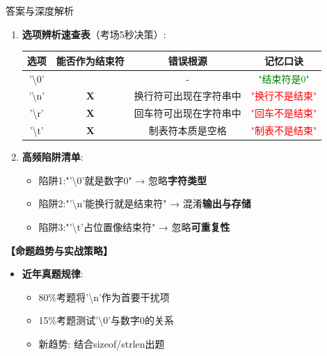 \documentclass[a4paper,12pt]{article}
\begin{document}
\begin{bluebox}{答案与深度解析}
\begin{enumerate}[leftmargin=*, nosep]
		\item \textbf{选项辨析速查表}（考场5秒决策）:
		      \begin{tabular}{|c|c|c|c|}
			      \hline
			      \textbf{选项}        & \textbf{能否作为结束符} & \textbf{错误根源} & \textbf{记忆口诀}              \\
			      \hline
			      '\textbackslash0'  & \checkmark       & -             & \textcolor{green}{"结束符是0"} \\
			      \hline
			      '\textbackslash n' & \textbf{X}       & 换行符可出现在字符串中   & \textcolor{red}{"换行不是结束"}  \\
			      \hline
			      '\textbackslash r' & \textbf{X}       & 回车符可出现在字符串中   & \textcolor{red}{"回车不是结束"}  \\
			      \hline
			      '\textbackslash t' & \textbf{X}       & 制表符本质是空格      & \textcolor{red}{"制表不是结束"}  \\
			      \hline
		      \end{tabular}

		\item \textbf{高频陷阱清单}:
		      \begin{itemize}
			      \item 陷阱1:"'\textbackslash0'就是数字0" → 忽略\textbf{字符类型}
			      \item 陷阱2:"'\textbackslash n'能换行就是结束符" → 混淆\textbf{输出与存储}
			      \item 陷阱3:"'\textbackslash t'占位置像结束符" → 忽略\textbf{可重复性}
		      \end{itemize}
	\end{enumerate}

	\textbf{【命题趋势与实战策略】}
	\begin{itemize}[leftmargin=*, nosep]
		\item \textbf{近年真题规律}:
		      \begin{itemize}
			      \item 80\%考题将'\textbackslash n'作为首要干扰项
			      \item 15\%考题测试'\textbackslash0'与数字0的关系
			      \item 新趋势: 结合sizeof/strlen出题
		      \end{itemize}


\end{itemize}
\end{bluebox}
\end{document}
